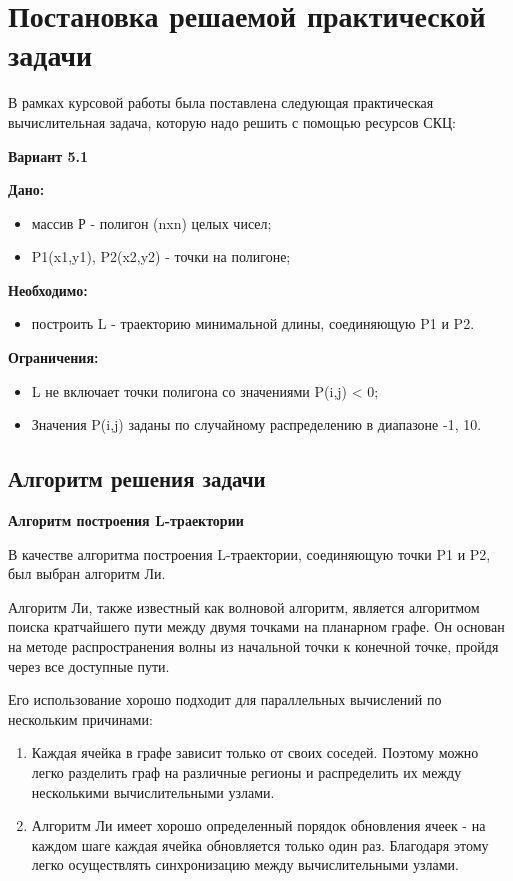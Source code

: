 \documentclass[a4paper, 12pt]{article}
\begin{document}

    \newpage
    \section{Постановка решаемой практической задачи}
    В рамках курсовой работы была поставлена следующая практическая вычислительная
    задача, которую надо решить с помощью ресурсов СКЦ:
    \vskip 0.3cm
    \par{\bf Вариант 5.1}
    \vskip 0.3cm
    \par {\bf Дано:} 
    \begin{itemize}
    \item массив Р - полигон (nxn) целых чисел;
    \item P1(x1,y1), P2(x2,y2) - точки на полигоне;
    \end{itemize}
    \vskip 0.3cm
    \par {\bf Необходимо:} 
    \begin{itemize}
    \item построить L - траекторию минимальной длины, соединяющую P1 и P2.
    \end{itemize}
    
    \vskip 0.3cm
    \par {\bf Ограничения:}
    \begin{itemize}
    \item L не включает точки полигона со значениями P(i,j) < 0;
    \item  Значения P(i,j)  заданы по случайному распределению в диапазоне -1, 10.
    \end{itemize}
    
    \subsection{Алгоритм решения задачи}
    \textbf{Алгоритм построения L-траектории} 
    
    В качестве алгоритма построения L-траектории, соединяющую точки P1 и P2, был выбран алгоритм Ли. 
    
    Алгоритм Ли, также известный как волновой алгоритм, является алгоритмом поиска кратчайшего пути между двумя точками на планарном графе. Он основан на методе распространения волны из начальной точки к конечной точке, пройдя через все доступные пути.
    
    Его использование хорошо подходит для параллельных вычислений по нескольким причинами:
    \begin{enumerate}
        \item Каждая ячейка в графе зависит только от своих соседей. Поэтому можно легко разделить граф на различные регионы и распределить их между несколькими вычислительными узлами.
        \item Алгоритм Ли имеет хорошо определенный порядок обновления ячеек - на каждом шаге каждая ячейка обновляется только один раз. Благодаря этому легко осуществлять синхронизацию между вычислительными узлами.
    \end{enumerate}
    
\end{document}
